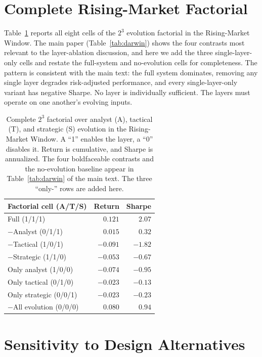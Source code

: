 \documentclass[letterpaper]{article}
\begin{document}
\section{Complete Rising-Market Factorial}
\label{app:factorial}

Table~\ref{tab:full-factorial} reports all eight cells of the $2^3$ evolution
factorial in the Rising-Market Window. The main paper (Table~\ref{tab:darwin})
shows the four contrasts most relevant to the layer-ablation discussion, and here we
add the three single-layer-only cells and restate the full-system and no-evolution
cells for completeness. The pattern is consistent with the main text: the full
system dominates, removing any single layer degrades risk-adjusted performance, and
every single-layer-only variant has negative Sharpe. No layer is
individually sufficient. The layers must operate on one another's evolving inputs.

\begin{table}[tb]
\centering
\footnotesize
\setlength{\tabcolsep}{6pt}
\begin{tabular}{@{}lrr@{}}
\toprule
Factorial cell (A/T/S) & Return & Sharpe \\
\midrule
Full \hfill (1/1/1)             & $\mathbf{0.121}$ & $\mathbf{2.07}$ \\
$-$Analyst \hfill (0/1/1)       & $0.015$  & $0.32$  \\
$-$Tactical \hfill (1/0/1)      & $-0.091$ & $-1.82$ \\
$-$Strategic \hfill (1/1/0)     & $-0.053$ & $-0.67$ \\
Only analyst \hfill (1/0/0)     & $-0.074$ & $-0.95$ \\
Only tactical \hfill (0/1/0)    & $-0.023$ & $-0.13$ \\
Only strategic \hfill (0/0/1)   & $-0.023$ & $-0.23$ \\
$-$All evolution \hfill (0/0/0) & $0.080$  & $0.94$  \\
\bottomrule
\end{tabular}
\caption{Complete $2^3$ factorial over analyst (A), tactical (T), and strategic (S)
evolution in the Rising-Market Window. A ``1'' enables the layer, a ``0'' disables
it. Return is cumulative, and Sharpe is annualized. The four boldfaceable contrasts and
the no-evolution baseline appear in Table~\ref{tab:darwin} of the main text. The three ``only-'' rows are added here.}
\label{tab:full-factorial}
\end{table}

\section{Sensitivity to Design Alternatives}
\label{app:design}
\end{document}
